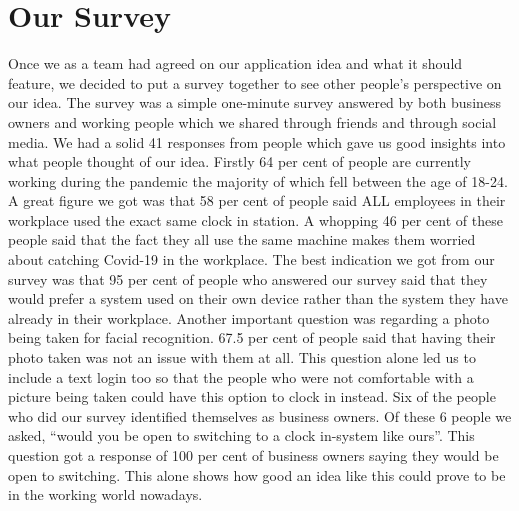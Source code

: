 \section{Our Survey}
Once we as a team had agreed on our application idea and what it should feature, we decided to put a survey together to see other people’s perspective on our idea. The survey was a simple one-minute survey answered by both business owners and working people which we shared through friends and through social media. We had a solid 41 responses from people which gave us good insights into what people thought of our idea. Firstly 64 per cent of people are currently working during the pandemic the majority of which fell between the age of 18-24. A great figure we got was that 58 per cent of people said ALL employees in their workplace used the exact same clock in station. 
A whopping 46 per cent of these people said that the fact they all use the same machine makes them worried about catching Covid-19 in the workplace. The best indication we got from our survey was that 95 per cent of people who answered our survey said that they would prefer a system used on their own device rather than the system they have already in their workplace.
Another important question was regarding a photo being taken for facial recognition. 67.5 per cent of people said that having their photo taken was not an issue with them at all. This question alone led us to include a text login too so that the people who were not comfortable with a picture being taken could have this option to clock in instead.
Six of the people who did our survey identified themselves as business owners. Of these 6 people we asked, “would you be open to switching to a clock in-system like ours”. This question got a response of 100 per cent of business owners saying they would be open to switching. This alone shows how good an idea like this could prove to be in the working world nowadays.


